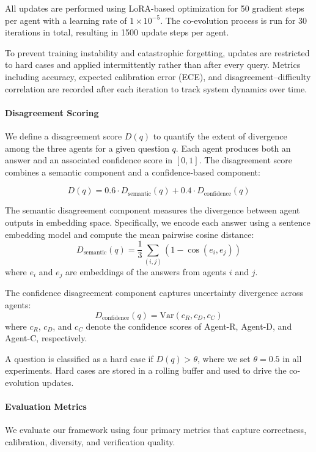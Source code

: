 \documentclass{article}
\begin{document}
All updates are performed using LoRA-based optimization for 50 gradient steps per agent with a learning rate of $1 \times 10^{-5}$. The co-evolution process is run for 30 iterations in total, resulting in 1500 update steps per agent.

To prevent training instability and catastrophic forgetting, updates are restricted to hard cases and applied intermittently rather than after every query. Metrics including accuracy, expected calibration error (ECE), and disagreement–difficulty correlation are recorded after each iteration to track system dynamics over time.
\paragraph{Disagreement Scoring}
We define a disagreement score $D(q)$ to quantify the extent of divergence among the three agents for a given question $q$. Each agent produces both an answer and an associated confidence score in $[0,1]$. The disagreement score combines a semantic component and a confidence-based component:

\begin{equation}
D(q) = 0.6 \cdot D_{\text{semantic}}(q) + 0.4 \cdot D_{\text{confidence}}(q)
\end{equation}

The semantic disagreement component measures the divergence between agent outputs in embedding space. Specifically, we encode each answer using a sentence embedding model and compute the mean pairwise cosine distance:
\begin{equation}
D_{\text{semantic}}(q) = \frac{1}{3} \sum_{(i,j)} \left(1 - \cos\left(e_i, e_j\right)\right)
\end{equation}
where $e_i$ and $e_j$ are embeddings of the answers from agents $i$ and $j$.

The confidence disagreement component captures uncertainty divergence across agents:
\begin{equation}
D_{\text{confidence}}(q) = \mathrm{Var}(c_R, c_D, c_C)
\end{equation}
where $c_R$, $c_D$, and $c_C$ denote the confidence scores of Agent-R, Agent-D, and Agent-C, respectively.

A question is classified as a hard case if $D(q) > \theta$, where we set $\theta = 0.5$ in all experiments. Hard cases are stored in a rolling buffer and used to drive the co-evolution updates.
\paragraph{Evaluation Metrics}
We evaluate our framework using four primary metrics that capture correctness, calibration, diversity, and verification quality.
\end{document}

